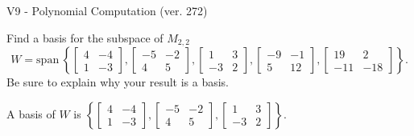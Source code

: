 \begin{exercise}
  \begin{exerciseTitle}V9 - Polynomial Computation (ver. 272)\end{exerciseTitle}
  \begin{exerciseStatement}
    Find a basis for the subspace of \(M_{2,2}\) 
\[W=\mathrm{span}\ \left\{\left[\begin{array}{cc}
4 & -4 \\
1 & -3
\end{array}\right] , \left[\begin{array}{cc}
-5 & -2 \\
4 & 5
\end{array}\right] , \left[\begin{array}{cc}
1 & 3 \\
-3 & 2
\end{array}\right] , \left[\begin{array}{cc}
-9 & -1 \\
5 & 12
\end{array}\right] , \left[\begin{array}{cc}
19 & 2 \\
-11 & -18
\end{array}\right]\right\}.\]
 Be sure to explain why your result is a basis.


  \end{exerciseStatement}
  \begin{exerciseAnswer}
   A basis of \(W\) is  \(\left\{\left[\begin{array}{cc}
4 & -4 \\
1 & -3
\end{array}\right] , \left[\begin{array}{cc}
-5 & -2 \\
4 & 5
\end{array}\right] , \left[\begin{array}{cc}
1 & 3 \\
-3 & 2
\end{array}\right]\right\}\).
  


  \end{exerciseAnswer}
\end{exercise}